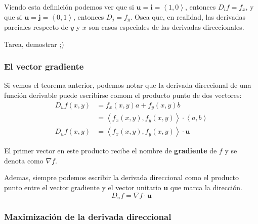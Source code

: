\documentclass[12pt]{article}
\begin{document}
Viendo esta definición podemos ver que si $ \mathbf{u}=\mathbf{i}=\left\langle 1,0 \right\rangle $, entonces $ D_{i}f=f_{x} $, y que si $ \mathbf{u}=\mathbf{j}=\left\langle 0,1 \right\rangle $, entonces $ D_{j}=f_{y} $. Osea que, en realidad, las derivadas parciales respecto de $ y $ y $ x $ son casos especiales de las derivadas direccionales.

\vspace{0.2cm}
\vspace{0.2cm}

Tarea, demostrar ;)

\subsubsection{El vector gradiente}
Si vemos el teorema anterior, podemos notar que la derivada direccional de una función derivable puede escribirse comom el producto punto de dos vectores:
\begin{align*}
  D_{u}f(x,y) &= f_{x}(x,y)a+f_{y}(x,y)b\\
   &= \left\langle f_{x}(x,y),f_{y}(x,y) \right\rangle\cdot \left\langle a,b \right\rangle\\
  D_{u}f(x,y) &= \left\langle f_{x}(x,y),f_{y}(x,y) \right\rangle\cdot \mathbf{u}
\end{align*}

El primer vector en este producto recibe el nombre de \textbf{gradiente} de $ f $ y se denota como $ \nabla f $.

\vspace{0.2cm}
\vspace{0.2cm}

Ademas, siempre podemos escribir la derivada direccional como el producto punto entre el vector gradiente y el vector unitario $ \mathbf{u} $ que marca la dirección.
\[
D_{u}f = \nabla f \cdot \mathbf{u}
\]

\subsubsection{Maximización de la derivada direccional}



\newpage
{}
\printbibliography
\end{document}
